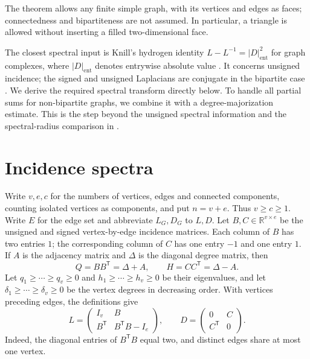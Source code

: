 \documentclass[11pt]{article}
\newcommand{\R}{\mathbb{R}}
\newcommand{\T}{\mathsf{T}}
\begin{document}
The theorem allows any finite simple graph, with its vertices and edges as
faces; connectedness and bipartiteness are not assumed. In particular, a
triangle is allowed without inserting a filled two-dimensional face.

The closest spectral input is Knill's hydrogen identity
$L-L^{-1}=|D|_{\mathrm{ent}}^2$ for graph complexes, where
$|D|_{\mathrm{ent}}$ denotes entrywise absolute value
\cite[Theorem 1, Section 2.4]{Knill2018}. It concerns unsigned incidence;
the signed and unsigned Laplacians are conjugate in the bipartite case
\cite[Section 1.4]{Knill2018}. We derive the required spectral transform
directly below. To handle all partial sums for non-bipartite graphs, we
combine it with a degree-majorization estimate. This is the step beyond
the unsigned spectral information and the spectral-radius comparison in
\cite[Corollary 1, Section 2.7]{Knill2018}.

\section{Incidence spectra}

Write $v,e,c$ for the numbers of vertices, edges and connected components,
counting isolated vertices as components, and put $n=v+e$. Thus
$v\geq c\geq1$. Write $E$ for the edge set and abbreviate $L_G,D_G$ to
$L,D$. Let $B,C\in\R^{v\times e}$ be the unsigned and signed
vertex-by-edge incidence matrices. Each column of $B$ has two entries $1$;
the corresponding column of $C$ has one entry $-1$ and one entry $1$.
If $A$ is the adjacency matrix and $\Delta$ is the diagonal degree matrix,
then
\begin{equation}\label{eq:laplacians}
 Q=BB^{\T}=\Delta+A,\qquad H=CC^{\T}=\Delta-A.
\end{equation}
Let $q_1\geq\cdots\geq q_v\geq0$ and
$h_1\geq\cdots\geq h_v\geq0$ be their eigenvalues, and let
$\delta_1\geq\cdots\geq\delta_v\geq0$ be the vertex degrees in decreasing
order. With vertices preceding edges, the definitions give
\begin{equation}\label{eq:blocks}
 L=\begin{pmatrix}I_v&B\\ B^{\T}&B^{\T}B-I_e\end{pmatrix},\qquad
 D=\begin{pmatrix}0&C\\ C^{\T}&0\end{pmatrix}.
\end{equation}
Indeed, the diagonal entries of $B^{\T}B$ equal two, and distinct edges
share at most one vertex.
\end{document}
